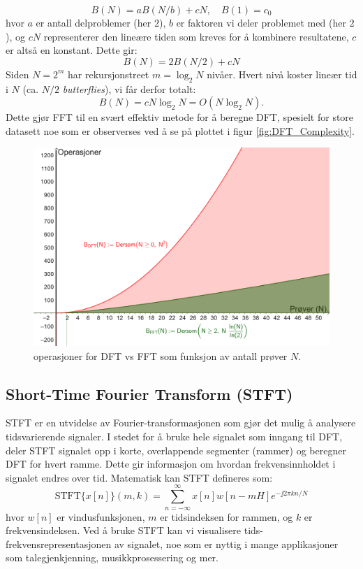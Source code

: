 \[
    B(N) = aB(N/b) + cN, \quad B(1) = c_0
\]
hvor $a$ er antall delproblemer (her $2$), $b$ er faktoren vi deler problemet med (her $2$), og $cN$ representerer den lineære tiden som kreves for å kombinere resultatene, $c$ er altså en konstant. Dette gir:
\[
    B(N) = 2B(N/2) + cN
\]
Siden $N=2^m$ har rekursjonstreet $m=\log_2 N$ nivåer. Hvert nivå koster lineær tid i $N$ (ca. $N/2$ \emph{butterflies}), vi får derfor totalt:
\[
    B(N)=cN\log_2 N=O(N\log_2 N).
\]
Dette gjør FFT til en svært effektiv metode for å beregne DFT, spesielt for store datasett noe som er observerses ved å se på plottet i figur \ref{fig:DFT_Complexity}.
\begin{figure}[h]
    \centering
    \includegraphics[width=.9\textwidth]{./Media/DFT_Complexity_VS_FFT.png}
    \caption{operasjoner for DFT vs FFT som funksjon av antall prøver $N$.}
    \label{fig:FFT_Complexity}
\end{figure}
\clearpage 
\noindent
\subsection{Short-Time Fourier Transform (STFT)}
STFT er en utvidelse av Fourier-transformasjonen som gjør det mulig å analysere tidsvarierende signaler. I stedet for å bruke hele signalet som inngang til DFT, deler STFT signalet opp i korte, overlappende segmenter (rammer) og beregner DFT for hvert ramme. Dette gir informasjon om hvordan frekvensinnholdet i signalet endres over tid. Matematisk kan STFT defineres som:
\[
    \text{STFT}\{x[n]\}(m, k) = \sum_{n=-\infty}^{\infty} x[n] w[n - mH] e^{-\jj 2 \pi k n / N}
\]
hvor \(w[n]\) er vindusfunksjonen, \(m\) er tidsindeksen for rammen, og \(k\) er frekvensindeksen. Ved å bruke STFT kan vi visualisere tids-frekvensrepresentasjonen av signalet, noe som er nyttig i mange applikasjoner som talegjenkjenning, musikkprosessering og mer.

